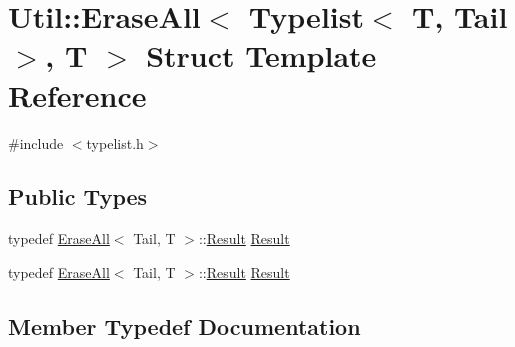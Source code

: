 \hypertarget{structUtil_1_1TL_1_1EraseAll_3_01Typelist_3_01T_00_01Tail_01_4_00_01T_01_4}{}\section{Util\+:\+:Erase\+All$<$ Typelist$<$ T, Tail $>$, T $>$ Struct Template Reference}
\label{structUtil_1_1TL_1_1EraseAll_3_01Typelist_3_01T_00_01Tail_01_4_00_01T_01_4}


{\ttfamily \#include $<$typelist.\+h$>$}

\subsection*{Public Types}
\begin{DoxyCompactItemize}
\item 
typedef \mbox{\hyperlink{structUtil_1_1TL_1_1EraseAll}{Erase\+All}}$<$ Tail, T $>$\+::\mbox{\hyperlink{structUtil_1_1TL_1_1EraseAll_3_01Typelist_3_01T_00_01Tail_01_4_00_01T_01_4_a19df041eef8d861bbb0369642bbd5378}{Result}} \mbox{\hyperlink{structUtil_1_1TL_1_1EraseAll_3_01Typelist_3_01T_00_01Tail_01_4_00_01T_01_4_a19df041eef8d861bbb0369642bbd5378}{Result}}
\item 
typedef \mbox{\hyperlink{structUtil_1_1TL_1_1EraseAll}{Erase\+All}}$<$ Tail, T $>$\+::\mbox{\hyperlink{structUtil_1_1TL_1_1EraseAll_3_01Typelist_3_01T_00_01Tail_01_4_00_01T_01_4_a19df041eef8d861bbb0369642bbd5378}{Result}} \mbox{\hyperlink{structUtil_1_1TL_1_1EraseAll_3_01Typelist_3_01T_00_01Tail_01_4_00_01T_01_4_a19df041eef8d861bbb0369642bbd5378}{Result}}
\end{DoxyCompactItemize}


\subsection{Member Typedef Documentation}
\mbox{\label{structUtil_1_1TL_1_1EraseAll_3_01Typelist_3_01T_00_01Tail_01_4_00_01T_01_4_a19df041eef8d861bbb0369642bbd5378}} 

